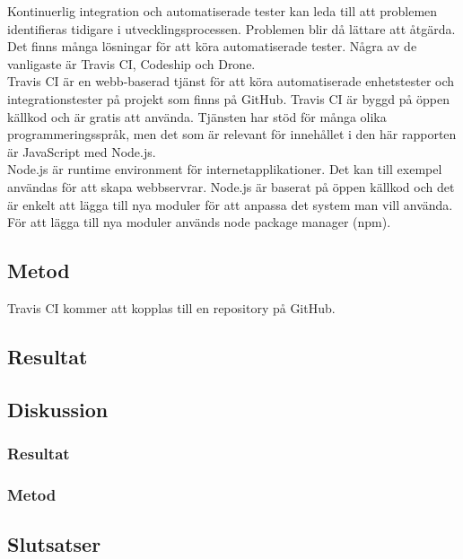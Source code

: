 Kontinuerlig integration och automatiserade tester kan leda till att problemen identifieras tidigare i 
utvecklingsprocessen. Problemen blir då lättare att åtgärda.\\

Det finns många lösningar för att köra automatiserade tester. Några av de vanligaste är Travis CI, Codeship och Drone.\\

Travis CI är en webb-baserad tjänst för att köra automatiserade enhetstester och integrationstester
på projekt som finns på GitHub. Travis CI är byggd på öppen källkod och är gratis att använda. 
Tjänsten har stöd för många olika programmeringsspråk, men det som är relevant för innehållet i den här rapporten
är JavaScript med Node.js.\\

Node.js är runtime environment för internetapplikationer. Det kan till exempel användas för att skapa webbservrar.
Node.js är baserat på öppen källkod och det är enkelt att lägga till nya moduler för att anpassa det system man vill
använda. För att lägga till nya moduler används node package manager (npm).\\
\subsection{Metod}
Travis CI kommer att kopplas till en repository på GitHub.

\subsection{Resultat}
\subsection{Diskussion}
\subsubsection{Resultat}
\subsubsection{Metod}
\subsection{Slutsatser}
